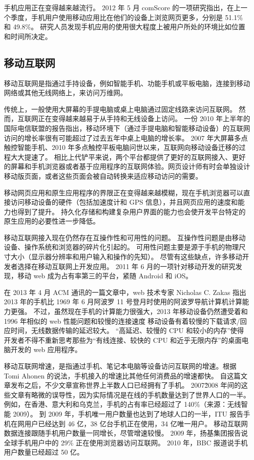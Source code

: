 手机应用正在变得越来越流行。
2012 年 5 月 comScore 的一项研究指出，在上一个季度，手机用户使用移动应用比在他们的设备上浏览网页更多，分别是 51.1\% 和 49.8\%。
研究人员发现手机应用的使用很大程度上被用户所处的环境比如位置和时间所决定。

\subsection{移动互联网}

移动互联网是指通过手持设备，例如智能手机、功能手机或平板电脑，连接到移动网络或其他无线网络上，来访问万维网。

传统上，一般使用大屏幕的手提电脑或桌上电脑通过固定线路来访问互联网。
然而，互联网正在变得越来越易于从手持和无线设备上访问。
一份 2010 年上半年的国际电信联盟的报告指出，移动环境下（通过手提电脑和智能移动设备）的互联网访问的增长率很有可能超过了过去五年中桌上电脑的增长率。
2007 年大屏幕多点触控智能手机、2010 年多点触控平板电脑问世以来，互联网向移动设备迁移的过程大大提速了。
相比上代铲平来说，两个平台都提供了更好的互联网接入、更好的屏幕和手机浏览器或者基于应用程序的互联网体验。网页设计师有时会单独设计移动版页面，或者这些页面会被自动转换来适应移动访问的需要。

移动网页应用和原生应用程序的界限正在变得越来越模糊，现在手机浏览器可以直接访问移动设备的硬件（包括加速度计和 GPS 信息），并且网页应用的速度和能力也得到了提升。
持久化存储和构建复杂用户界面的能力也会使开发平台特定的原生应用的必要性进一步降低。

移动互联网接入现在仍然存在互操作性和可用性的问题。
互操作性问题是由移动设备、操作系统和浏览器的碎片化引起的。
可用性问题主要是源于手机的物理尺寸大小（显示器分辨率和用户输入和操作的先知）。
尽管有这些缺点，许多移动开发者选择在移动互联网上开发应用。
2011 年 6 月的一项针对移动开发的研究发现，移动 web 成为占有率第三的平台，紧随 Android 和 iOS。

在 2013 年 4 月 ACM 通讯的一篇文章中，web 技术专家 Nicholas C. Zakas 指出 2013 年的手机比 1969 年 6 月阿波罗 11 号登月时使用的阿波罗导航计算机计算能力更强。
不过，虽然现在手机的计算能力很强大，2013 年移动设备仍然遭受着和 1996 年相似的 web 性能问题和较慢的连接速度
移动设备有着较慢的下载请求/回应时间，无线数据传输的延迟较大。
“高延迟、较慢的 CPU 和较小的内存”使得开发者不得不重新思考那些为“有线连接、较快的 CPU 和近乎无限内存”的桌面电脑开发的 web 应用程序。

移动互联网增速，是指通过手机、笔记本电脑等设备访问互联网的增速。根据 Tomi Ahonen 的说法，手机接入的增速比其他任何消费品的增速都快。
自这篇文章发布之后，不少文章宣称世界上半数人口已经拥有了手机。
2007\~2008 年间的这些文章有略微的误导性，因为实际情况是在线的手机数量达到了世界人口的一半。
例如，在香港、意大利和乌克兰，手机的占有率已经超过了 140\%（来源：无线智能 2009）。
到 2009 年，手机唯一用户数量也达到了地球人口的一半，ITU 报告手机在网用户已经达到 46 亿，38 亿台手机正在使用，34 亿唯一用户。
移动互联网数据连接跟随手机用户数量一同增长，尽管增速较慢。
2009 年，扬基集团报告说全球手机用户中的 29\% 正在使用浏览器访问互联网。
2010 年，BBC 报道说手机用户数量已经超过 50 亿。

